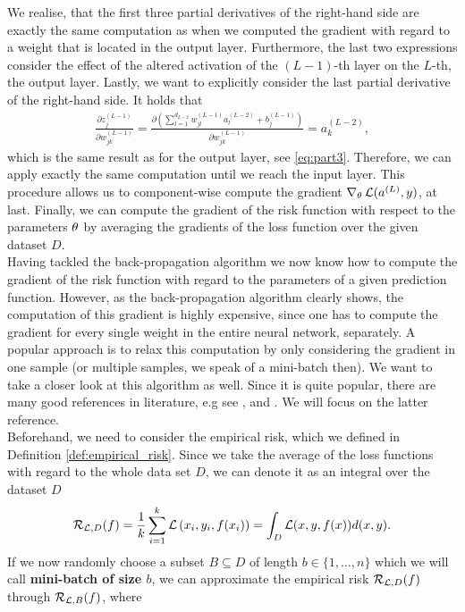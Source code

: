 We realise, that the first three partial derivatives of the right-hand side are exactly the same computation as when we computed the gradient with regard to a weight that is located in the output layer. Furthermore, the last two expressions consider the effect of the altered activation of the $(L-1)$-th layer on the $L$-th, the output layer. Lastly, we want to explicitly consider the last partial derivative of the right-hand side. It holds that
\begin{align*}
\frac{\partial z_j^{(L-1)}}{\partial w^{(L-1)}_{jk}} = \frac{\partial \left(\sum_{l=1}^{d_{L-2}} w_{jl}^{(L-1)}a_l^{(L-2)} + b_j^{(L-1)}\right)}{\partial w^{(L-1)}_{jk}} = a_k^{(L-2)},
\end{align*}
which is the same result as for the output layer, see \eqref{eq:part3}. Therefore, we can apply exactly the same computation until we reach the input layer. This procedure allows us to component-wise compute the gradient $\nabla_{\theta}\operatorname{\mathcal{L}}(a^{(L)}, y)$, at last. Finally, we can compute the gradient of the risk function with respect to the parameters $\theta$ by averaging the gradients of the loss function over the given dataset $D$.\\
Having tackled the back-propagation algorithm we now know how to compute the gradient of the risk function with regard to the parameters of a given prediction function. However, as the back-propagation algorithm clearly shows, the computation of this gradient is highly expensive, since one has to compute the gradient for every single weight in the entire neural network, separately. A popular approach is to relax this computation by only considering the gradient in one sample (or multiple samples, we speak of a mini-batch then). We want to take a closer look at this algorithm as well. Since it is quite popular, there are many good references in literature, e.g see \cite[Chapter~13.3.2]{sra2012optimization}, \cite[Chapter~4.2]{saad2009line} and \cite{turinici2021convergence}. We will focus on the latter reference.\\
Beforehand, we need to consider the empirical risk, which we defined in Definition \ref{def:empirical_risk}. Since we take the average of the loss functions with regard to the whole data set $D$, we can denote it as an integral over the dataset $D$
\begin{align*}
\operatorname{\mathcal{R}}_{\operatorname{\mathcal{L}}, D} (f) = \frac{1}{k} \sum_{i=1}^{k} \operatorname{\mathcal{L}}\left(x_i, y_i, f(x_i)\right) = \int_{D} \operatorname{\mathcal{L}}(x,y,f(x)) d(x,y).
\end{align*}
If we now randomly choose a subset $B \subseteq D$ of length $b\in\{1,\ldots,n\}$ which we will call \textbf{mini-batch of size $b$}, we can approximate the empirical risk $\operatorname{\mathcal{R}}_{\operatorname{\mathcal{L}}, D} (f)$ through $\operatorname{\mathcal{R}}_{\operatorname{\mathcal{L}}, B} (f)$, where

